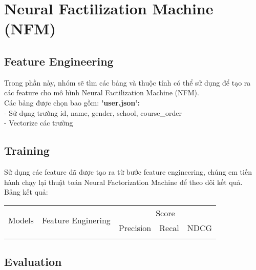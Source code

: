 \section{Neural Factilization Machine (NFM)}
\subsection{Feature Engineering}
Trong phần này, nhóm sẽ tìm các bảng và thuộc tính có thể sử dụng để tạo ra các feature cho mô hình Neural Factilization Machine (NFM).\\
Các bảng được chọn bao gồm:
\textbf{'user.json':}\\
- Sử dụng trường id, name, gender, school, course_order\\
- Vectorize các trường\\
\subsection{Training}
Sử dụng các feature đã được tạo ra từ bước feature engineering, chúng em tiến hành chạy lại thuật toán Neural Factorization Machine để theo dõi kết quả.\\
Bảng kết quả:
\begin{table}[]
    \begin{tabular}{ccclllll}
    \hline
    \multirow{2}{*}{Models} & \multirow{2}{*}{Feature Enginering} & \multicolumn{6}{c}{Score}                                                            \\ \cline{3-8} 
                            &                                     & \multicolumn{2}{c}{Precision} & \multicolumn{2}{c}{Recal} & \multicolumn{2}{c}{NDCG} \\ \hline
    \multicolumn{1}{l}{}    & \multicolumn{1}{l}{}                & \multicolumn{1}{l}{}    &     &             &             &             &           
    \end{tabular}
    \end{table}
\subsection{Evaluation}